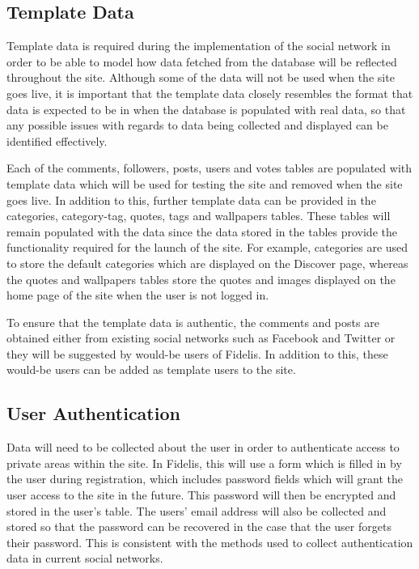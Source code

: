 \subsection{Template Data}
Template data is required during the implementation of the social network in order to be able to model how data fetched from the database will be reflected throughout the site. Although some of the data will not be used when the site goes live, it is important that the template data closely resembles the format that data is expected to be in when the database is populated with real data, so that any possible issues with regards to data being collected and displayed can be identified effectively.

Each of the comments, followers, posts, users and votes tables are populated with template data which will be used for testing the site and removed when the site goes live. In addition to this, further template data can be provided in the categories, category-tag, quotes, tags and wallpapers tables. These tables will remain populated with the data since the data stored in the tables provide the functionality required for the launch of the site. For example, categories are used to store the default categories which are displayed on the Discover page, whereas the quotes and wallpapers tables store the quotes and images displayed on the home page of the site when the user is not logged in.

To ensure that the template data is authentic, the comments and posts are obtained either from existing social networks such as Facebook and Twitter or they will be suggested by would-be users of Fidelis. In addition to this, these would-be users can be added as template users to the site.

\subsection{User Authentication}
Data will need to be collected about the user in order to authenticate access to private areas within the site. In Fidelis, this will use a form which is filled in by the user during registration, which includes password fields which will grant the user access to the site in the future. This password will then be encrypted and stored in the user's table. The users' email address will also be collected and stored so that the password can be recovered in the case that the user forgets their password. This is consistent with the methods used to collect authentication data in current social networks.